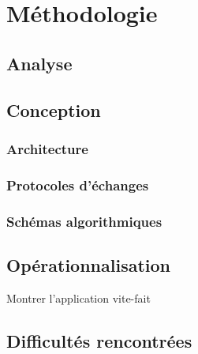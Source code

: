 \chapter{Méthodologie} \label{Methodologie}



\section{Analyse}







\section{Conception}

\subsection{Architecture}

\subsection{Protocoles d'échanges}

\subsection{Schémas algorithmiques}


\section{Opérationnalisation}


Montrer l'application vite-fait




\section{Difficultés rencontrées}